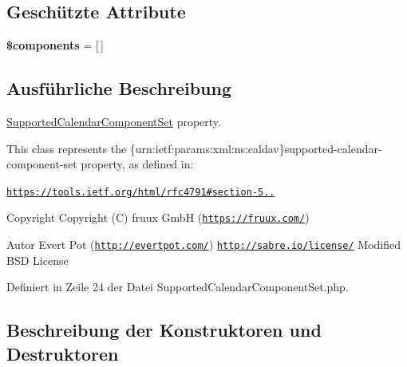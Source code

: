 \subsection*{Geschützte Attribute}
\begin{DoxyCompactItemize}
\item 
\mbox{\label{class_sabre_1_1_cal_d_a_v_1_1_xml_1_1_property_1_1_supported_calendar_component_set_aefab99c138da31cb62ce9ea72bbafd33}} 
{\bfseries \$components} = \mbox{[}$\,$\mbox{]}
\end{DoxyCompactItemize}


\subsection{Ausführliche Beschreibung}
\mbox{\hyperlink{class_sabre_1_1_cal_d_a_v_1_1_xml_1_1_property_1_1_supported_calendar_component_set}{Supported\+Calendar\+Component\+Set}} property.

This class represents the \{urn\+:ietf\+:params\+:xml\+:ns\+:caldav\}supported-\/calendar-\/component-\/set property, as defined in\+:

\href{https://tools.ietf.org/html/rfc4791#section-5.2.3}{\tt https\+://tools.\+ietf.\+org/html/rfc4791\#section-\/5..}

\begin{DoxyCopyright}{Copyright}
Copyright (C) fruux GmbH (\href{https://fruux.com/}{\tt https\+://fruux.\+com/}) 
\end{DoxyCopyright}
\begin{DoxyAuthor}{Autor}
Evert Pot (\href{http://evertpot.com/}{\tt http\+://evertpot.\+com/})  \href{http://sabre.io/license/}{\tt http\+://sabre.\+io/license/} Modified B\+SD License 
\end{DoxyAuthor}


Definiert in Zeile 24 der Datei Supported\+Calendar\+Component\+Set.\+php.



\subsection{Beschreibung der Konstruktoren und Destruktoren}
\mbox{\label{class_sabre_1_1_cal_d_a_v_1_1_xml_1_1_property_1_1_supported_calendar_component_set_afeeb30a29eb8f0120ccab2c17865f216}} 
